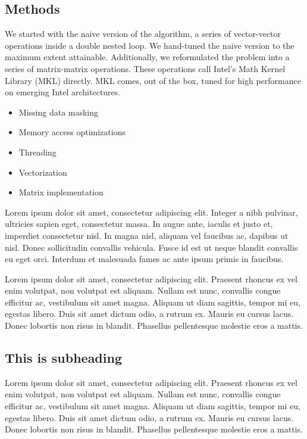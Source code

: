 \documentclass{bioinfo}
\begin{document}
\begin{methods}
\section{Methods}

We started with the naive version of the algorithm, a series of vector-vector 
operations inside a double nested loop. We hand-tuned the naive version to the 
maximum extent attainable. Additionally, we reformulated the problem into a series of 
matrix-matrix operations. These operations call Intel’s Math Kernel Library (MKL) 
directly. MKL comes, out of the box, tuned for high performance on emerging 
Intel architectures.

\begin{itemize}
\item Missing data masking
\item Memory access optimizations
\item Threading
\item Vectorization
\item Matrix implementation
\end{itemize}

Lorem ipsum dolor sit amet, consectetur adipiscing elit. Integer a 
nibh pulvinar, ultricies sapien eget, consectetur massa. In augue 
ante, iaculis et justo et, imperdiet consectetur nisl. In magna 
nisl, aliquam vel faucibus ac, dapibus ut nisl. Donec sollicitudin 
convallis vehicula. Fusce id est ut neque blandit convallis eu eget 
orci. Interdum et malesuada fames ac ante ipsum primis in faucibus. 

Lorem ipsum dolor sit amet, consectetur adipiscing elit. Praesent 
rhoncus ex vel enim volutpat, non volutpat est aliquam. Nullam est 
nunc, convallis congue efficitur ac, vestibulum sit amet magna. 
Aliquam ut diam sagittis, tempor mi eu, egestas libero. Duis sit 
amet dictum odio, a rutrum ex. Mauris eu cursus lacus. Donec 
lobortis non risus in blandit. Phasellus pellentesque molestie 
eros a mattis. 

\subsection{This is subheading}

Lorem ipsum dolor sit amet, consectetur adipiscing elit. Praesent 
rhoncus ex vel enim volutpat, non volutpat est aliquam. Nullam est 
nunc, convallis congue efficitur ac, vestibulum sit amet magna. 
Aliquam ut diam sagittis, tempor mi eu, egestas libero. Duis sit 
amet dictum odio, a rutrum ex. Mauris eu cursus lacus. Donec 
lobortis non risus in blandit. Phasellus pellentesque molestie 
eros a mattis. 


\end{methods}
\end{document}
